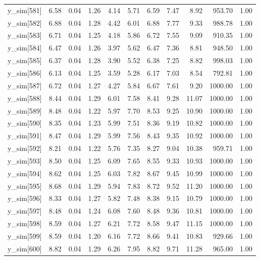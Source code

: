 \begin{table}[ht]
\begin{tabular}{rrrrrrrrrrr}
  y\_sim[581] & 6.58 & 0.04 & 1.26 & 4.14 & 5.71 & 6.59 & 7.47 & 8.92 & 953.70 & 1.00 \\ 
  y\_sim[582] & 6.88 & 0.04 & 1.28 & 4.42 & 6.01 & 6.88 & 7.77 & 9.33 & 988.78 & 1.00 \\ 
  y\_sim[583] & 6.71 & 0.04 & 1.25 & 4.18 & 5.86 & 6.72 & 7.55 & 9.09 & 910.35 & 1.00 \\ 
  y\_sim[584] & 6.47 & 0.04 & 1.26 & 3.97 & 5.62 & 6.47 & 7.36 & 8.81 & 948.50 & 1.00 \\ 
  y\_sim[585] & 6.37 & 0.04 & 1.28 & 3.90 & 5.52 & 6.38 & 7.25 & 8.82 & 998.03 & 1.00 \\ 
  y\_sim[586] & 6.13 & 0.04 & 1.25 & 3.59 & 5.28 & 6.17 & 7.03 & 8.54 & 792.81 & 1.00 \\ 
  y\_sim[587] & 6.72 & 0.04 & 1.27 & 4.27 & 5.84 & 6.67 & 7.61 & 9.20 & 1000.00 & 1.00 \\ 
  y\_sim[588] & 8.44 & 0.04 & 1.29 & 6.01 & 7.58 & 8.41 & 9.28 & 11.07 & 1000.00 & 1.00 \\ 
  y\_sim[589] & 8.48 & 0.04 & 1.22 & 5.97 & 7.70 & 8.53 & 9.25 & 10.90 & 1000.00 & 1.00 \\ 
  y\_sim[590] & 8.35 & 0.04 & 1.23 & 5.99 & 7.51 & 8.36 & 9.19 & 10.82 & 1000.00 & 1.00 \\ 
  y\_sim[591] & 8.47 & 0.04 & 1.29 & 5.99 & 7.56 & 8.43 & 9.35 & 10.92 & 1000.00 & 1.00 \\ 
  y\_sim[592] & 8.21 & 0.04 & 1.22 & 5.76 & 7.35 & 8.27 & 9.04 & 10.38 & 959.71 & 1.00 \\ 
  y\_sim[593] & 8.50 & 0.04 & 1.25 & 6.09 & 7.65 & 8.55 & 9.33 & 10.93 & 1000.00 & 1.00 \\ 
  y\_sim[594] & 8.62 & 0.04 & 1.25 & 6.03 & 7.82 & 8.67 & 9.45 & 10.99 & 1000.00 & 1.00 \\ 
  y\_sim[595] & 8.68 & 0.04 & 1.29 & 5.94 & 7.83 & 8.72 & 9.52 & 11.20 & 1000.00 & 1.00 \\ 
  y\_sim[596] & 8.33 & 0.04 & 1.27 & 5.82 & 7.48 & 8.38 & 9.15 & 10.79 & 1000.00 & 1.00 \\ 
  y\_sim[597] & 8.48 & 0.04 & 1.24 & 6.08 & 7.60 & 8.48 & 9.36 & 10.81 & 1000.00 & 1.00 \\ 
  y\_sim[598] & 8.59 & 0.04 & 1.27 & 6.21 & 7.72 & 8.58 & 9.47 & 11.15 & 1000.00 & 1.00 \\ 
  y\_sim[599] & 8.59 & 0.04 & 1.20 & 6.16 & 7.72 & 8.66 & 9.41 & 10.83 & 929.66 & 1.00 \\ 
  y\_sim[600] & 8.82 & 0.04 & 1.29 & 6.26 & 7.95 & 8.82 & 9.71 & 11.28 & 965.00 & 1.00 \\ 

\end{tabular}
\end{table}

